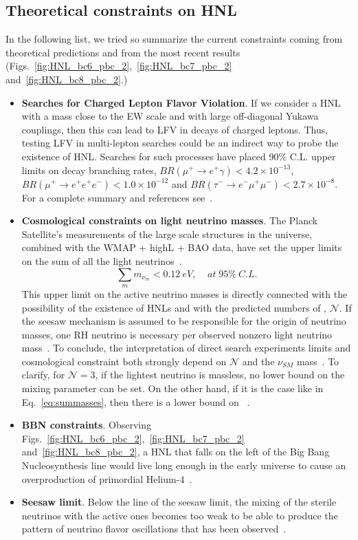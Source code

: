 \subsection{Theoretical constraints on HNL}
In the following list, we tried so summarize the current constraints
coming from theoretical predictions and from the most recent results (Figs.~\ref{fig:HNL_bc6_pbc_2},~\ref{fig:HNL_bc7_pbc_2}
and~\ref{fig:HNL_bc8_pbc_2}.)
\begin{itemize}
\item \textbf{Searches for Charged Lepton Flavor Violation}. If we consider a HNL with a
  mass close to the EW scale and with large off-diagonal Yukawa couplings,
  then this can lead to LFV in decays of charged leptons. Thus,
  testing LFV in multi-lepton searches could be an indirect way to
  probe the existence of HNL. Searches for such processes have
  placed 90\% C.L. upper limits on decay branching rates, \ie
  $BR(\mu^+\rightarrow e^+\gamma) < 4.2\times 10^{-13}$,
  $BR(\mu^+\rightarrow e^+e^+e^-) < 1.0\times 10^{-12}$ and
  $BR(\tau^-\rightarrow e^-\mu^+\mu^-) < 2.7\times 10^{-8}$. For a 
  complete summary and references see~\cite{Pascoli_2019}.
\item \textbf{Cosmological constraints on light neutrino masses}. The Planck
  Satellite's measurements of the large scale structures in the
  universe, combined with the WMAP + highL + BAO data, have set the
  upper limits on the sum of all the light
  neutrinos~\cite{Aghanim:2018eyx}.
\begin{equation}
\label{eq:summasses}
\sum_{m} m_{\nu_m} < 0.12 \: eV, \;\;\;\; at \;95\% \: C.L.
\end{equation}
This upper limit on the active neutrino masses is directly connected
with the possibility of the existence of HNLs and with the predicted
numbers of \hnl, $\mathcal{N}$.
If the seesaw mechanism is assumed to be responsible for the origin of neutrino masses,
one RH neutrino is necessary per observed nonzero light
neutrino mass~\cite{Alekhin_2016}.
To conclude, the interpretation of direct search experiments limits and cosmological constraint both strongly
depend on $\mathcal{N}$ and the $\nu_{SM}$
mass~\cite{DREWES2017250,drewes2015theoretical}. To clarify, for
$\mathcal{N}=3$, if the lightest neutrino is massless, no
lower bound on the mixing parameter \mixpar can be set.
On the other hand, if it is the case like in Eq.~\ref{eq:summasses}, then there is a lower
bound on \mixpar~\cite{DREWES2017250}.
\item \textbf{BBN constraints}. Observing
  Figs.~\ref{fig:HNL_bc6_pbc_2},~\ref{fig:HNL_bc7_pbc_2}
  and~\ref{fig:HNL_bc8_pbc_2}, a HNL that falls on the left of the
  Big Bang Nucleosynthesis line would live long enough in
  the early universe to cause an overproduction of primordial
  Helium-4~\cite{Ruchayskiy_2012}.
\item \textbf{Seesaw limit}. Below the line of the seesaw limit, the
  mixing of the sterile neutrinos with the active ones becomes too
  weak to be able to produce the pattern of neutrino flavor oscillations that has been observed~\cite{Canetti_2010}. 
\end{itemize}

